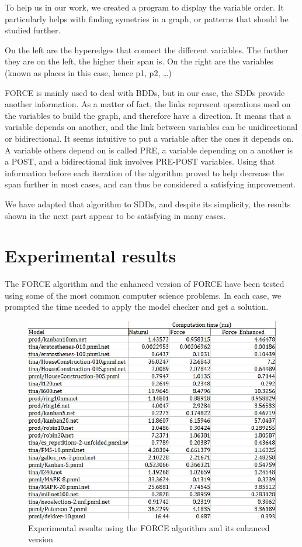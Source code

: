 \documentclass[12pt]{report}
\begin{document}
To help us in our work, we created a program to display the variable order. It particularly helps with finding symetries in a graph, or patterns that should be studied further.

On the left are the hyperedges that connect the different variables. The further they are on the left, the higher their span is. On the right are the variables (known as places in this case, hence p1, p2, \ldots)

FORCE is mainly used to deal with BDDs, but in our case, the SDDs provide another information. As a matter of fact, the links represent operations used on the variables to build the graph, and therefore have a direction. It means that a variable depends on another, and the link between variables can be unidirectional or bidirectional. It seems intuitive to put a variable after the ones it depends on. A variable others depend on is called PRE, a variable depending on a another is a POST, and a bidirectional link involves PRE-POST variables. Using that information before each iteration of the algorithm proved to help decrease the span further in most cases, and can thus be considered a satisfying improvement.

We have adapted that algorithm to SDDs, and despite its simplicity, the results shown in the next part appear to be satisfying in many cases.

\chapter{Experimental results}

The FORCE algorithm and the enhanced version of FORCE have been tested using some of the most common computer science problems. In each case, we prompted the time needed to apply the model checker and get a solution.

\begin{figure}[!h]
  \includegraphics[scale=0.35]{images/force_results.jpg}
  \caption{Experimental results using the FORCE algorithm and its enhanced version}
  \label{force_results}
\end{figure}
\end{document}
